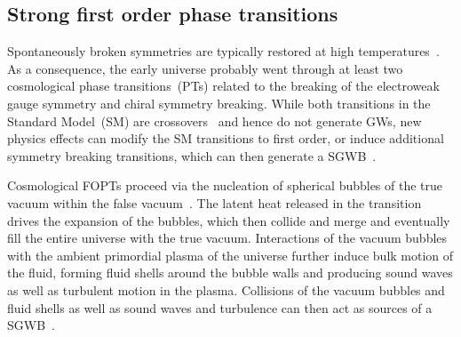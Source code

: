 \documentclass{article}
\begin{document}
\subsection{Strong first order phase transitions}
\label{sec:FOPT}

Spontaneously broken symmetries are typically restored at high temperatures~\cite{Kirzhnits:1972ut}.
As a consequence, the early universe probably went through at least two cosmological phase transitions~(PTs) related to the breaking of the electroweak gauge symmetry and chiral symmetry breaking.
While both transitions in the Standard Model~(SM) are crossovers~\cite{DOnofrio:2015gop,HotQCD:2018pds} and hence do not generate GWs, new physics effects can modify the SM transitions to first order, or induce additional symmetry breaking transitions, which can then generate a SGWB~\cite{Witten:1984rs,Hogan:1986qda}.

Cosmological FOPTs proceed via the nucleation of spherical bubbles of the true vacuum within the false vacuum~\cite{Coleman:1977py,Callan:1977pt,Linde:1980tt,Linde:1981zj}.
The latent heat released in the transition drives the expansion of the bubbles, which then collide and merge and eventually fill the entire universe with the true vacuum. 
Interactions of the vacuum bubbles with the ambient primordial plasma of the universe further induce bulk motion of the fluid, forming fluid shells around the bubble walls and producing sound waves as well as turbulent motion in the plasma.
Collisions of the vacuum bubbles and fluid shells as well as sound waves and turbulence can then act as sources of a SGWB~\cite{Witten:1984rs,Hogan:1986qda,Kamionkowski:1993fg}.
\end{document}
